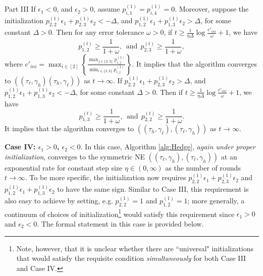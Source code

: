 \begin{theoremfour}{Part III}
    If $\epsilon_1<0$, and $\epsilon_2>0$, assume $p^{(1)}_{i,1}=p^{(1)}_{i,4}=0$. Moreover, suppose the initialization 
$p^{(1)}_{2,2}\epsilon_1+p^{(1)}_{2,3}\epsilon_2<-\Delta$, and $p^{(1)}_{1,2}\epsilon_1+p^{(1)}_{1,3}\epsilon_2>\Delta$, for some constant $\Delta>0$. Then for any error tolerance $\omega>0$, if $t\geq \frac{1}{\eta\Delta}\log \frac{c'_{ini}}{\omega}+1$, we have  
\[
p^{(t)}_{1,2}\geq \frac{1}{1+\omega}, \ \ \text{and}\ \ p^{(t)}_{2,3}\geq \frac{1}{1+\omega},
\]
where $c'_{ini}=\max_{i\in[2]}\left\{\frac{\max_{j\in\{2,3\}}p^{(1)}_{i,j}}{\min_{i\in\{2,3\}}p^{(1)}_{i,j}}\right\}$. It implies that the algorithm converges to $((\tau_{\ell},\gamma_{h})(\tau_{h},\gamma_{\ell}))$ as $t \to \infty$. If $p^{(1)}_{2,2}\epsilon_1+p^{(1)}_{2,3}\epsilon_2>\Delta$, and $p^{(1)}_{1,2}\epsilon_1+p^{(1)}_{1,3}\epsilon_2<-\Delta$, for some constant $\Delta>0$. Then if $t\geq \frac{1}{\eta\Delta}\log \frac{c'_{ini}}{\omega}+1$, we have   
\[
p^{(t)}_{1,3}\geq \frac{1}{1+\omega},\ \ \text{and}\ \ p^{(t)}_{2,2}\geq \frac{1}{1+\omega}.
\]
 It implies that the algorithm converges to $((\tau_{h},\gamma_{\ell}),(\tau_{\ell},\gamma_{h}))$ as $t \to \infty$.
\end{theoremfour}

\noindent \textbf{Case IV: $\epsilon_1>0$, $\epsilon_2<0$}. In this case, Algorithm \ref{alg:Hedge}, \emph{again under proper initialization}, converges to the symmetric NE $((\tau_{\ell},\gamma_{h}),(\tau_{\ell},\gamma_{h}))$ at an exponential rate for constant step size $\eta \in (0,\infty)$ as the number of rounds $t \to \infty$.
To be more specific, the initialization now requires $p^{(1)}_{2,2}\epsilon_1+p^{(1)}_{2,3}\epsilon_2$ and $p^{(1)}_{1,2}\epsilon_1+p^{(1)}_{1,3}\epsilon_2$ to have the same sign. 
Similar to Case III, this requirement is also easy to achieve by setting, e.g. $p^{(1)}_{2,2} = 1$ and $p^{(1)}_{1,2} = 1$; more generally, a continuum of choices of initialization\footnote{Note, however, that it is unclear whether there are ``universal" initializations that would satisfy the requisite condition \emph{simultaneously} for both Case III and Case IV.} would satisfy this requirement since $\epsilon_1 > 0$ and $\epsilon_2 < 0$.
The formal statement in this case is provided below.

